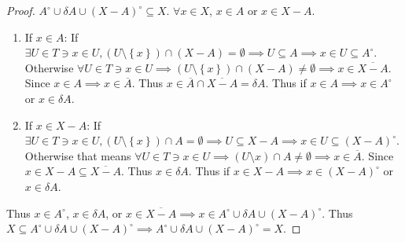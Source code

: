 \documentclass{article}
\begin{document}
\begin{proof}
    $A^\circ \cup \delta A \cup (X - A)^\circ \subseteq X$. $\forall x \in X$, $x \in A$ or $x \in X - A$. 
    
    \begin{enumerate}
        \item If $x \in A$: If $\exists U \in T \ni x \in U, (U \setminus \left\{ x \right\}) \cap (X - A) = \emptyset \implies U \subseteq A \implies x \in U \subseteq A^\circ$. Otherwise $\forall U \in T \ni x \in U \implies (U \setminus \left\{ x \right\}) \cap (X - A) \neq \emptyset \implies x \in \overline{X - A}$. Since $x \in A \implies x \in \overline{A}$. Thus $x \in \overline{A} \cap \overline{X - A} = \delta A$. Thus if $x \in A \implies x \in A^\circ$ or $x \in \delta A$.         
        \item If $x \in X - A$: If $\exists U \in T \ni x \in U, (U \setminus \left\{ x \right\}) \cap A = \emptyset \implies U \subseteq X - A \implies x \in U \subseteq (X - A)^\circ$. Otherwise that means $\forall U \in T \ni x \in U \implies \left(U \setminus {x
        }\right) \cap A \neq \emptyset \implies x \in \overline{A}$. Since $x \in X - A \subseteq \overline{X - A}$. Thus $x \in \delta A$. Thus if $x \in X - A \implies x \in (X - A)^\circ$ or $x \in \delta A$. 
    \end{enumerate}

    Thus $x \in A^\circ$, $x \in \delta A$, or $x \in \overline{X - A} \implies x \in A^\circ \cup \delta A \cup (X - A)^\circ$. Thus $X \subseteq A^\circ \cup \delta A \cup (X - A)^\circ \implies A^\circ \cup \delta A \cup (X - A)^\circ = X$.    
    
\end{proof}

\bigskip
\end{document}
